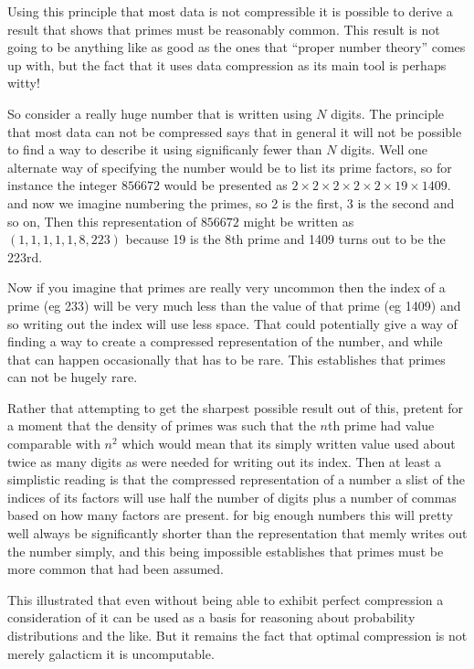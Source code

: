 Using this principle that most data is not compressible it is possible to
derive a result that shows that primes must be reasonably common. This
result is not going to be anything like as good as the ones that ``proper
number theory'' comes up with, but the fact that it uses data compression
as its main tool is perhaps witty!

So consider a really huge number that is written using $N$ digits. The
principle that most data can not be compressed says that in general
it will not be possible to find a way to describe it using significanly
fewer than $N$ digits. Well one alternate way of specifying the
number would be to list its prime factors, so for instance the
integer $856672$ would be presented as $2 \times 2 \times 2
\times 2 \times 2 \times 19 \times 1409$.
and now we imagine numbering the primes, so 2 is the first, 3 is the second
and so on, Then this representation of $856672$ might be written
as $(1,1,1,1,1,8,223)$ because 19 is the 8th prime and 1409 turns out
to be the 223rd.

Now if you imagine that primes are really very
uncommon then the index of a prime (eg 233) will be very much less than
the value of that prime (eg 1409) and so writing out the index will
use less space. That could potentially give a way of finding a way to
create a compressed representation of the number, and while that can
happen occasionally that has to be rare. This establishes that primes can
not be hugely rare.

Rather that attempting to get the sharpest possible result out of this,
pretent for a moment that the density of primes was such that the
$n$th prime had value comparable with $n^2$ which would mean that
its simply written value used about twice as many digits as were needed
for writing out its index. Then at least a simplistic reading is that the
compressed representation of a number a slist of the indices of its
factors will use half the number of digits plus a number of commas
based on how many factors are present. for big enough numbers this will
pretty well always be significantly shorter than the representation that
memly writes out the number simply, and this being impossible establishes
that primes must be more common that had been assumed.

This illustrated that even without being able to exhibit perfect compression
a consideration of it can be used as a basis for reasoning about
probability distributions and the like. But it remains the fact that
optimal compression is not merely galacticm it is uncomputable.
